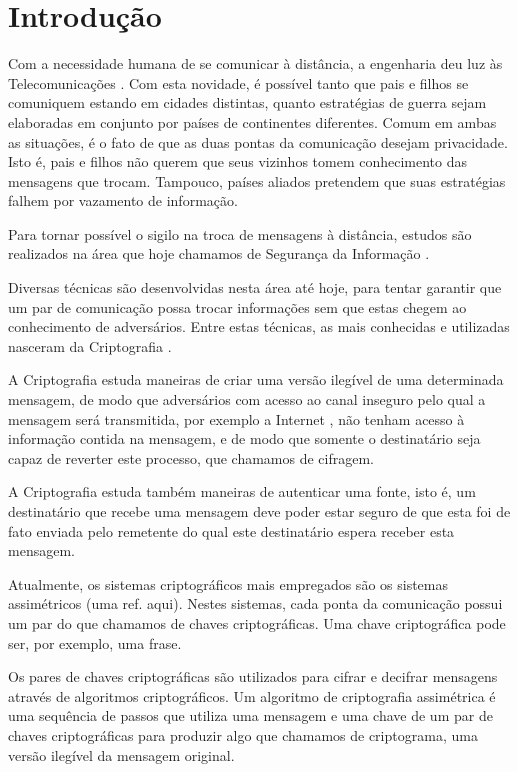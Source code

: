 
\chapter{Introdução}

Com a necessidade humana de se comunicar à distância, a engenharia deu luz às
Telecomunicações \cite{telecommunications}. Com esta novidade, é possível tanto
que pais e filhos se comuniquem estando em cidades distintas, quanto estratégias
de guerra sejam elaboradas em conjunto por países de continentes
diferentes. Comum em ambas as situações, é o fato de que as duas pontas da
comunicação desejam privacidade. Isto é, pais e filhos não querem que seus
vizinhos tomem conhecimento das mensagens que trocam. Tampouco, países aliados
pretendem que suas estratégias falhem por vazamento de informação.

Para tornar possível o sigilo na troca de mensagens à distância, estudos são
realizados na área que hoje chamamos de Segurança da Informação
\cite{information_security}.

Diversas técnicas são desenvolvidas nesta área até hoje, para tentar garantir
que um par de comunicação possa trocar informações sem que estas chegem ao
conhecimento de adversários. Entre estas técnicas, as mais conhecidas e
utilizadas nasceram da Criptografia \cite{cryptography}.

A Criptografia estuda maneiras de criar uma versão ilegível de uma determinada
mensagem, de modo que adversários com acesso ao canal inseguro pelo qual a
mensagem será transmitida, por exemplo a Internet \cite{internet}, não tenham
acesso à informação contida na mensagem, e de modo que somente o destinatário
seja capaz de reverter este processo, que chamamos de cifragem.

A Criptografia estuda também maneiras de autenticar uma fonte, isto é, um
destinatário que recebe uma mensagem deve poder estar seguro de que esta foi de
fato enviada pelo remetente do qual este destinatário espera receber esta
mensagem.

Atualmente, os sistemas criptográficos mais empregados são os sistemas
assimétricos (uma ref. aqui). Nestes sistemas, cada ponta da comunicação possui
um par do que chamamos de chaves criptográficas. Uma chave criptográfica pode
ser, por exemplo, uma frase.

Os pares de chaves criptográficas são utilizados para cifrar e decifrar
mensagens através de algoritmos criptográficos. Um algoritmo de criptografia
assimétrica é uma sequência de passos que utiliza uma mensagem e uma chave de um
par de chaves criptográficas para produzir algo que chamamos de criptograma, uma
versão ilegível da mensagem original.

